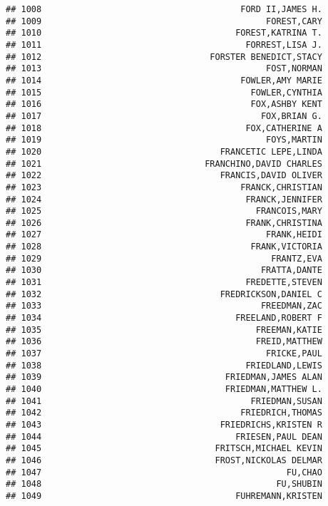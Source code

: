 \documentclass[
]{article}
\begin{document}
\begin{verbatim}
## 1008                                       FORD II,JAMES H.
## 1009                                            FOREST,CARY
## 1010                                      FOREST,KATRINA T.
## 1011                                        FORREST,LISA J.
## 1012                                 FORSTER BENEDICT,STACY
## 1013                                            FOST,NORMAN
## 1014                                       FOWLER,AMY MARIE
## 1015                                         FOWLER,CYNTHIA
## 1016                                         FOX,ASHBY KENT
## 1017                                           FOX,BRIAN G.
## 1018                                        FOX,CATHERINE A
## 1019                                            FOYS,MARTIN
## 1020                                   FRANCETIC LEPE,LINDA
## 1021                                FRANCHINO,DAVID CHARLES
## 1022                                   FRANCIS,DAVID OLIVER
## 1023                                       FRANCK,CHRISTIAN
## 1024                                        FRANCK,JENNIFER
## 1025                                          FRANCOIS,MARY
## 1026                                        FRANK,CHRISTINA
## 1027                                            FRANK,HEIDI
## 1028                                         FRANK,VICTORIA
## 1029                                             FRANTZ,EVA
## 1030                                           FRATTA,DANTE
## 1031                                        FREDETTE,STEVEN
## 1032                                   FREDRICKSON,DANIEL C
## 1033                                           FREEDMAN,ZAC
## 1034                                      FREELAND,ROBERT F
## 1035                                          FREEMAN,KATIE
## 1036                                          FREID,MATTHEW
## 1037                                            FRICKE,PAUL
## 1038                                        FRIEDLAND,LEWIS
## 1039                                    FRIEDMAN,JAMES ALAN
## 1040                                    FRIEDMAN,MATTHEW L.
## 1041                                         FRIEDMAN,SUSAN
## 1042                                       FRIEDRICH,THOMAS
## 1043                                   FRIEDRICHS,KRISTEN R
## 1044                                      FRIESEN,PAUL DEAN
## 1045                                  FRITSCH,MICHAEL KEVIN
## 1046                                  FROST,NICKOLAS DELMAR
## 1047                                                FU,CHAO
## 1048                                              FU,SHUBIN
## 1049                                      FUHREMANN,KRISTEN

\end{verbatim}
\end{document}
